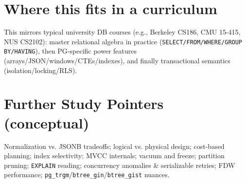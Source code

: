 \documentclass[10pt]{article}
\begin{document}
\section{Where this fits in a curriculum}
This mirrors typical university DB courses (e.g., Berkeley CS186, CMU 15-415, NUS CS2102): master relational algebra in practice (\texttt{SELECT/FROM/WHERE/GROUP BY/HAVING}), then PG-specific power features (arrays/JSON/windows/CTEs/indexes), and finally transactional semantics (isolation/locking/RLS).

\section{Further Study Pointers (conceptual)}
Normalization vs. JSONB tradeoffs; logical vs. physical design; cost-based planning; index selectivity; MVCC internals; vacuum and freeze; partition pruning; \texttt{EXPLAIN} reading; concurrency anomalies \& serializable retries; FDW performance; \texttt{pg\_trgm}/\texttt{btree\_gin}/\texttt{btree\_gist} nuances.
\end{document}
